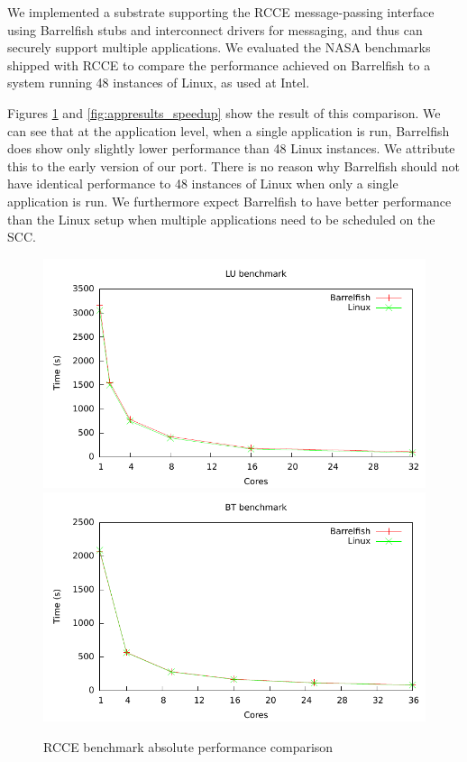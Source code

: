 \documentclass[a4paper,twoside]{report} %
\begin{document}
We implemented a substrate supporting the RCCE message-passing
interface using Barrelfish stubs and interconnect drivers for
messaging, and thus can securely support multiple applications. We
evaluated the NASA benchmarks shipped with RCCE to compare the
performance achieved on Barrelfish to a system running 48 instances of
Linux, as used at Intel.

Figures \ref{fig:appresults_total} and \ref{fig:appresults_speedup}
show the result of this comparison. We can see that at the application
level, when a single application is run, Barrelfish does show only
slightly lower performance than 48 Linux instances. We attribute this
to the early version of our port. There is no reason why Barrelfish
should not have identical performance to 48 instances of Linux when
only a single application is run. We furthermore expect Barrelfish to
have better performance than the Linux setup when multiple
applications need to be scheduled on the SCC.

\begin{figure}
  \centering
  \includegraphics[width=.5\textwidth]{plots/rcce_bench/rcce_lu.pdf}%
  \includegraphics[width=.5\textwidth]{plots/rcce_bench/rcce_bt.pdf}
  \caption{RCCE benchmark absolute performance comparison}
  \label{fig:appresults_total}
\end{figure}
\end{document}
